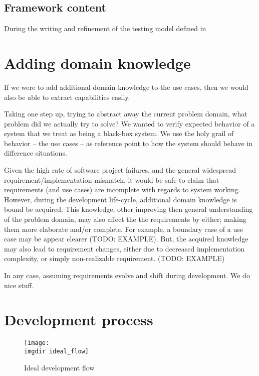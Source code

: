 \subsection{Framework content}

During the writing and refinement of the testing model defined in 


\section{Adding domain knowledge}
If we were to add additional domain knowledge to the use cases, then we would also be able to extract capabilities easily.

Taking one step up, trying to abstract away the current problem domain, what problem did we actually try to solve? We wanted to verify expected behavior of a system that we treat as being a black-box system. We use the holy grail of behavior -- the use cases -- as reference point to how the system should behave in difference situations.


Given the high rate of software project failures, and the general widespread requirement/implementation mismatch, it would be safe to claim that requirements (and use cases) are incomplete with regards to system working. However, during the development life-cycle, additional domain knowledge is bound be acquired. This knowledge, other improving then general understanding of the problem domain, may also affect the the requirements by either; making them more elaborate and/or complete. For example, a boundary case of a use case may be appear clearer (TODO: EXAMPLE). But, the acquired knowledge may also lead to requirement changes, either due to decreased implementation complexity, or simply non-realizable requirement. (TODO: EXAMPLE)

In any case, assuming requirements evolve and shift during development. We do nice stuff.

\section{Development process}
\begin{figure}[ht]
\centering
\texttt{[image: \\imgdir ideal\_flow]}
\caption{Ideal development flow}
\label{fig:ideal_flow}
\end{figure}
